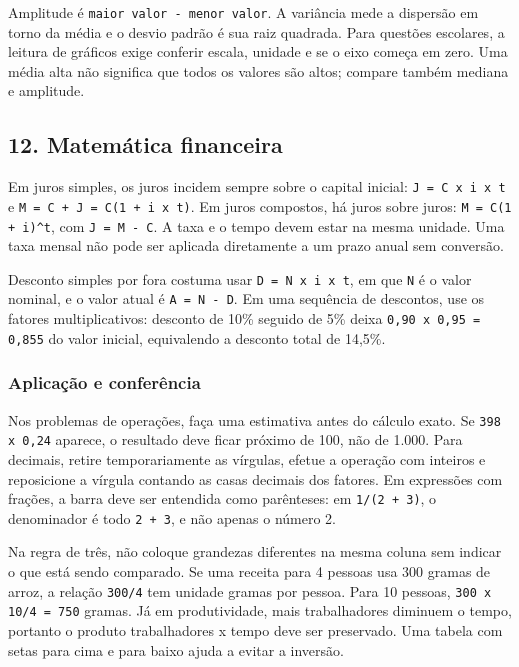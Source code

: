 \documentclass[11pt,a4paper]{article}
\begin{document}
Amplitude é \texttt{maior valor - menor valor}. A variância mede a dispersão em torno da média e o desvio padrão é sua raiz quadrada. Para questões escolares, a leitura de gráficos exige conferir escala, unidade e se o eixo começa em zero. Uma média alta não significa que todos os valores são altos; compare também mediana e amplitude.

\subsection*{12. Matemática financeira}

Em juros simples, os juros incidem sempre sobre o capital inicial: \texttt{J = C x i x t} e \texttt{M = C + J = C(1 + i x t)}. Em juros compostos, há juros sobre juros: \texttt{M = C(1 + i)\textasciicircum{}t}, com \texttt{J = M - C}. A taxa e o tempo devem estar na mesma unidade. Uma taxa mensal não pode ser aplicada diretamente a um prazo anual sem conversão.

Desconto simples por fora costuma usar \texttt{D = N x i x t}, em que \texttt{N} é o valor nominal, e o valor atual é \texttt{A = N - D}. Em uma sequência de descontos, use os fatores multiplicativos: desconto de 10\% seguido de 5\% deixa \texttt{0,90 x 0,95 = 0,855} do valor inicial, equivalendo a desconto total de 14,5\%.

\subsubsection*{Aplicação e conferência}

Nos problemas de operações, faça uma estimativa antes do cálculo exato. Se \texttt{398 x 0,24} aparece, o resultado deve ficar próximo de 100, não de 1.000. Para decimais, retire temporariamente as vírgulas, efetue a operação com inteiros e reposicione a vírgula contando as casas decimais dos fatores. Em expressões com frações, a barra deve ser entendida como parênteses: em \texttt{1/(2 + 3)}, o denominador é todo \texttt{2 + 3}, e não apenas o número 2.

Na regra de três, não coloque grandezas diferentes na mesma coluna sem indicar o que está sendo comparado. Se uma receita para 4 pessoas usa 300 gramas de arroz, a relação \texttt{300/4} tem unidade gramas por pessoa. Para 10 pessoas, \texttt{300 x 10/4 = 750} gramas. Já em produtividade, mais trabalhadores diminuem o tempo, portanto o produto trabalhadores x tempo deve ser preservado. Uma tabela com setas para cima e para baixo ajuda a evitar a inversão.
\end{document}
